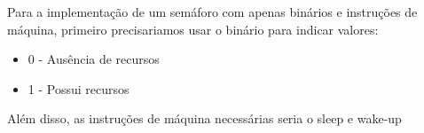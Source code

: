 \begin{question}
  
    Para a implementação de um semáforo com apenas binários 
    e instruções de máquina, primeiro precisariamos usar o binário 
    para indicar valores:

    \begin{itemize}
        \item 0 - Ausência de recursos
        \item 1 - Possui recursos
    \end{itemize}

    Além disso, as instruções de máquina necessárias seria 
    o sleep e wake-up

\end{question}
